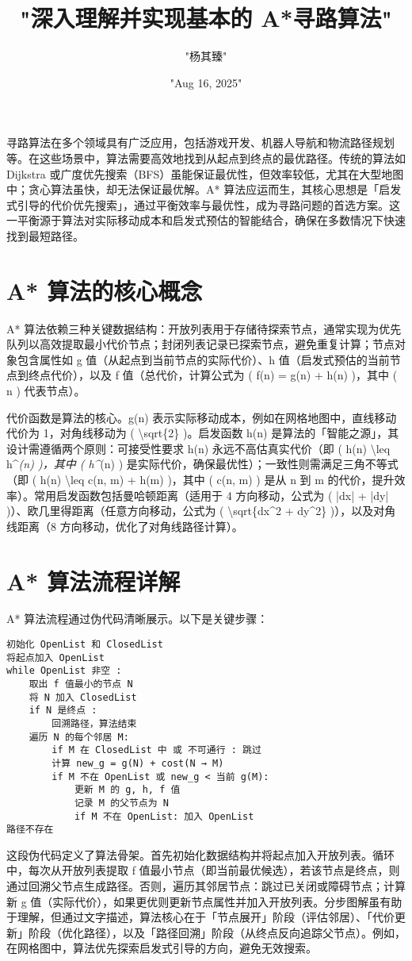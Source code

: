 \title{"深入理解并实现基本的 A*寻路算法"}
\author{"杨其臻"}
\date{"Aug 16, 2025"}
\maketitle
寻路算法在多个领域具有广泛应用，包括游戏开发、机器人导航和物流路径规划等。在这些场景中，算法需要高效地找到从起点到终点的最优路径。传统的算法如 Dijkstra 或广度优先搜索（BFS）虽能保证最优性，但效率较低，尤其在大型地图中；贪心算法虽快，却无法保证最优解。A* 算法应运而生，其核心思想是「启发式引导的代价优先搜索」，通过平衡效率与最优性，成为寻路问题的首选方案。这一平衡源于算法对实际移动成本和启发式预估的智能结合，确保在多数情况下快速找到最短路径。\par
\chapter{A* 算法的核心概念}
A* 算法依赖三种关键数据结构：开放列表用于存储待探索节点，通常实现为优先队列以高效提取最小代价节点；封闭列表记录已探索节点，避免重复计算；节点对象包含属性如 g 值（从起点到当前节点的实际代价）、h 值（启发式预估的当前节点到终点代价），以及 f 值（总代价，计算公式为 ( f(n) = g(n) + h(n) )，其中 ( n ) 代表节点）。\par
代价函数是算法的核心。g(n) 表示实际移动成本，例如在网格地图中，直线移动代价为 1，对角线移动为 ( \textbackslash{}sqrt\{{}2\}{} )。启发函数 h(n) 是算法的「智能之源」，其设计需遵循两个原则：可接受性要求 h(n) 永远不高估真实代价（即 ( h(n) \textbackslash{}leq h\^{}\textit{(n) )，其中 ( h\^{}}(n) ) 是实际代价，确保最优性）；一致性则需满足三角不等式（即 ( h(n) \textbackslash{}leq c(n, m) + h(m) )，其中 ( c(n, m) ) 是从 n 到 m 的代价，提升效率）。常用启发函数包括曼哈顿距离（适用于 4 方向移动，公式为 ( |dx| + |dy| )）、欧几里得距离（任意方向移动，公式为 ( \textbackslash{}sqrt\{{}dx\^{}2 + dy\^{}2\}{} )），以及对角线距离（8 方向移动，优化了对角线路径计算）。\par
\chapter{A* 算法流程详解}
A* 算法流程通过伪代码清晰展示。以下是关键步骤：\par
\begin{lstlisting}[language=plaintext]
初始化 OpenList 和 ClosedList
将起点加入 OpenList
while OpenList 非空 :
    取出 f 值最小的节点 N
    将 N 加入 ClosedList
    if N 是终点 : 
        回溯路径，算法结束
    遍历 N 的每个邻居 M:
        if M 在 ClosedList 中 或 不可通行 : 跳过
        计算 new_g = g(N) + cost(N → M)
        if M 不在 OpenList 或 new_g < 当前 g(M):
            更新 M 的 g, h, f 值
            记录 M 的父节点为 N
            if M 不在 OpenList: 加入 OpenList
路径不存在
\end{lstlisting}
这段伪代码定义了算法骨架。首先初始化数据结构并将起点加入开放列表。循环中，每次从开放列表提取 f 值最小节点（即当前最优候选），若该节点是终点，则通过回溯父节点生成路径。否则，遍历其邻居节点：跳过已关闭或障碍节点；计算新 g 值（实际代价），如果更优则更新节点属性并加入开放列表。分步图解虽有助于理解，但通过文字描述，算法核心在于「节点展开」阶段（评估邻居）、「代价更新」阶段（优化路径），以及「路径回溯」阶段（从终点反向追踪父节点）。例如，在网格图中，算法优先探索启发式引导的方向，避免无效搜索。\par
